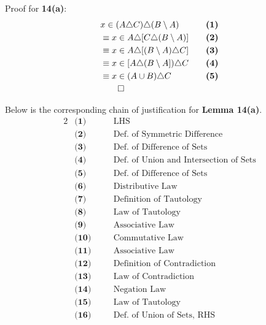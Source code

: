 Proof for \textbf{14(a)}:
\begin{alignat*}{2}
&x \in (A \triangle C) \triangle (B \setminus A) && \quad \textbf{(1)}\\
&\equiv x \in A \triangle [C \triangle (B \setminus A)] && \quad \textbf{(2)}\\
&\equiv x \in A \triangle [(B \setminus A) \triangle C] && \quad \textbf{(3)}\\
&\equiv x \in [A \triangle (B \setminus A]) \triangle C && \quad \textbf{(4)}\\
&\equiv x \in (A \cup B) \triangle C && \quad \textbf{(5)}\\
&\qed
\end{alignat*}
\pagebreak

Below is the corresponding chain of justification for \textbf{Lemma 14(a)}.
\begin{alignat*}{2}
&\textbf{(1)} && \quad \text{LHS}\\
&\textbf{(2)} && \quad \text{Def. of Symmetric Difference}\\
&\textbf{(3)} && \quad \text{Def. of Difference  of Sets}\\
&\textbf{(4)} && \quad \text{Def. of Union and Intersection of Sets}\\
&\textbf{(5)} && \quad \text{Def. of Difference  of Sets}\\
&\textbf{(6)} && \quad \text{Distributive Law}\\
&\textbf{(7)} && \quad \text{Definition of Tautology}\\
&\textbf{(8)} && \quad \text{Law of Tautology}\\
&\textbf{(9)} && \quad \text{Associative Law}\\
&\textbf{(10)} && \quad \text{Commutative Law}\\
&\textbf{(11)} && \quad \text{Associative Law}\\
&\textbf{(12)} && \quad \text{Definition of Contradiction}\\
&\textbf{(13)} && \quad \text{Law of Contradiction}\\
&\textbf{(14)} && \quad \text{Negation Law}\\
&\textbf{(15)} && \quad \text{Law of Tautology}\\
&\textbf{(16)} && \quad \text{Def. of Union of Sets, RHS}\\
\end{alignat*}

